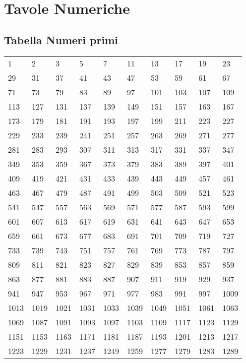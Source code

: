 \chapter{Tavole Numeriche}
\label{sec:TabelleNumeriche}
\section{Tabella Numeri primi}
\label{sec:TabellaNumeriPrrimi}
\begin{center}
	\begin{tabular}{llllllllll}
1 &2 &3 &5 &7 &11 &13 &17 &19 &23 \\
29 &31 &37 &41 &43 &47 &53 &59 &61 &67 \\
71 &73 &79 &83 &89 &97 &101 &103 &107 &109 \\
113 &127 &131 &137 &139 &149 &151 &157 &163 &167 \\
173 &179 &181 &191 &193 &197 &199 &211 &223 &227 \\
229 &233 &239 &241 &251 &257 &263 &269 &271 &277 \\
281 &283 &293 &307 &311 &313 &317 &331 &337 &347 \\
349 &353 &359 &367 &373 &379 &383 &389 &397 &401 \\
409 &419 &421 &431 &433 &439 &443 &449 &457 &461 \\
463 &467 &479 &487 &491 &499 &503 &509 &521 &523 \\
541 &547 &557 &563 &569 &571 &577 &587 &593 &599 \\
601 &607 &613 &617 &619 &631 &641 &643 &647 &653 \\
659 &661 &673 &677 &683 &691 &701 &709 &719 &727 \\
733 &739 &743 &751 &757 &761 &769 &773 &787 &797 \\
809 &811 &821 &823 &827 &829 &839 &853 &857 &859 \\
863 &877 &881 &883 &887 &907 &911 &919 &929 &937 \\
941 &947 &953 &967 &971 &977 &983 &991 &997 &1009 \\
1013 &1019 &1021 &1031 &1033 &1039 &1049 &1051 &1061 &1063 \\
1069 &1087 &1091 &1093 &1097 &1103 &1109 &1117 &1123 &1129 \\
1151 &1153 &1163 &1171 &1181 &1187 &1193 &1201 &1213 &1217 \\
1223 &1229 &1231 &1237 &1249 &1259 &1277 &1279 &1283 &1289 \\

\end{tabular}
\end{center}
